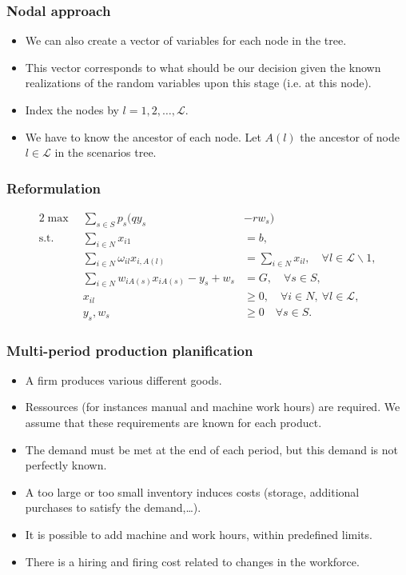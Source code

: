 \documentclass{beamer}
\begin{document}
\begin{frame}
\frametitle{Nodal approach}

\begin{itemize}
\item
We can also create a vector of variables for each node in the tree.
\item
This vector corresponds to what should be our decision given the known realizations of the random variables upon this stage (i.e. at this node).
\item
Index the nodes by $l = 1,2,\ldots,\mathcal{L}$.
\item
We have to know the ancestor of each node.
Let $A(l)$ the ancestor of node $l \in \mathcal{L}$ in the scenarios tree.
\end{itemize}

\end{frame}

\begin{frame}
\frametitle{Reformulation}

\begin{alignat*}{2}
\max\ & \sum_{s \in S} p_s (qy_{s} & - rw_{s})\\
\mbox{s.t. } & \sum_{i \in N} x_{i1} & = b,\\
& \sum_{i \in N} \omega_{il}x_{i,A(l)} & = \sum_{i \in N} x_{il}, \quad \forall l \in \mathcal{L} \backslash 1, \\
& \sum_{i \in N} w_{iA(s)}x_{iA(s)} - y_{s} + w_{s} & = G,
\quad {\forall s \in S}, \\
& x_{il} & \geq 0, \quad \forall i \in N,\ \forall l \in \mathcal{L},\\
& y_{s}, w_{s} & \geq 0 \quad {\forall s \in S}.
\end{alignat*}

\end{frame}

\begin{frame}
\frametitle{Multi-period production planification}

\begin{itemize}
\item
A firm produces various different goods.
\item
Ressources (for instances manual and machine work hours) are required.
We assume that these requirements are known for each product.
\item
The demand must be met at the end of each period, but this demand is not perfectly known.
\item
A too large or too small inventory induces costs (storage, additional purchases to satisfy the demand,\ldots).
\item
It is possible to add machine and work hours, within predefined limits.
\item
There is a hiring and firing cost related to changes in the workforce.
\end{itemize}

\end{frame}
\end{document}
